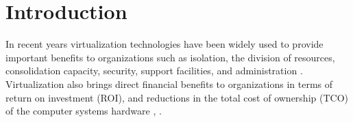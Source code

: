 	\section {Introduction}\label{sec:introduction}

	
	
	In recent years virtualization technologies have been widely used to provide important benefits to organizations such as isolation, the division of resources, consolidation capacity, security, support facilities, and administration \cite{Varasteh2017}.
	Virtualization also brings direct financial benefits to organizations in terms of return on investment (ROI), and reductions in the total cost of ownership (TCO) of the computer systems hardware \cite{Solis2014}, \cite{AbdElRahem2016}. 
	
